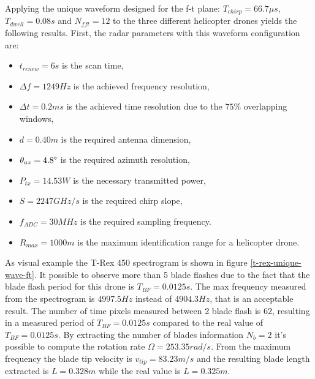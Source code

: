 Applying the unique waveform designed for the f-t plane: $T_{chirp} = 66.7 \mu s$, $T_{dwell} = 0.08s$ and $N_{fft} = 12 $ to the three different helicopter drones yields the following results.
First, the radar parameters with this waveform configuration are:

\begin{itemize}

    \item $t_{renew} = 6 s$ is the scan time,
    
    \item $\Delta f = 1249 Hz$ is the achieved frequency resolution,
    
    \item $\Delta t = 0.2 ms$ is the achieved time resolution due to the $75\%$ overlapping windows,
    
    \item $d = 0.40 m$ is the required antenna dimension,
         
    \item $\theta_{az} = 4.8\degree$ is the required azimuth resolution,

    \item $P_{tx} = 14.53 W$ is the necessary transmitted power,
    
    \item $S = 2247 GHz/s$ is the required chirp slope,
    
    \item $f_{ADC} = 30 MHz$ is the required sampling frequency.
    
    \item $R_{max} = 1000 m$ is the maximum identification range for a helicopter drone.

    
\end{itemize}

As visual example the T-Rex 450 spectrogram is shown in figure \ref{t-rex-unique-wave-ft}. It possible to observe more than 5 blade flashes due to the fact that the blade flash period for this drone is $T_{BF} = 0.0125 s$. The max frequency measured from the spectrogram is $4997.5 Hz$ instead of $4904.3 Hz$, that is an acceptable result. The number of time pixels measured between 2 blade flash is $62$, resulting in a measured period of $T_{BF} = 0.0125s$ compared to the real value of $T_{BF} = 0.0125s$. By extracting the number of blades information $N_{b} = 2$ it's possible to compute the rotation rate $\Omega = 253.35 rad/s$. From the maximum frequency the blade tip velocity  is $v_{tip}=83.23 m/s$ and the resulting blade length extracted is $L=0.328m$ while the real value is $L = 0.325m$.

